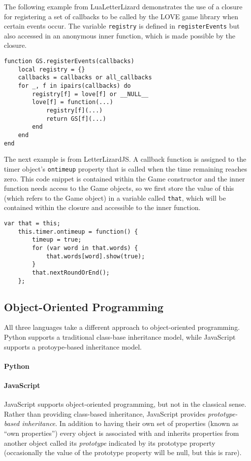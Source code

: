 The following example from LuaLetterLizard demonstrates the use of a closure
for registering a set of callbacks to be called by the LOVE game library when
certain events occur. The variable \texttt{registry} is defined in \texttt{registerEvents}
but also accessed in an anonymous inner function, which is made possible by the closure.

\begin{lstlisting}[language={[5.2]Lua},caption=A closure in Lua]
function GS.registerEvents(callbacks)
	local registry = {}
	callbacks = callbacks or all_callbacks
	for _, f in ipairs(callbacks) do
		registry[f] = love[f] or __NULL__
		love[f] = function(...)
			registry[f](...)
			return GS[f](...)
		end
	end
end
\end{lstlisting}

The next example is from LetterLizardJS. A callback function is assigned to the
timer object's \texttt{ontimeup} property that is called when the time remaining
reaches zero. This code snippet is contained within the Game constructor and the
inner function needs access to the Game objects, so we first store the value of this
(which refers to the Game object) in a variable called \texttt{that}, which will be
contained within the closure and accessible to the inner function.

\begin{lstlisting}[caption=A closure in JavaScript]
	var that = this;
	this.timer.ontimeup = function() {
		timeup = true;
		for (var word in that.words) {
			that.words[word].show(true);
		}
		that.nextRoundOrEnd();
	};
\end{lstlisting}

\subsection{Object-Oriented Programming}
\label{oop}


All three languages take a different approach to object-oriented programming.
Python supports a traditional class-base inheritance model, while JavaScript
supports a protoype-based inheritance model. 

\paragraph{Python}

\paragraph{JavaScript}
JavaScript supports object-oriented programming, but not in the classical
sense. Rather than providing class-based inheritance, JavaScript provides
\emph{prototype-based inheritance}. In addition to having their own set of 
properties (known as ``own properties'') every object is associated with and
inherits properties from another object called its \emph{prototype}
indicated by its prototype property (occasionally the value of the prototype
property will be null, but this is rare). 

